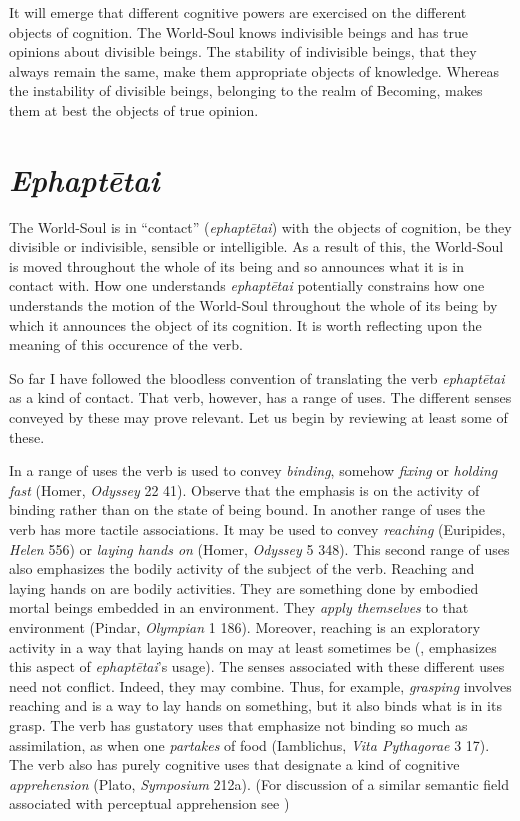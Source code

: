 It will emerge that different cognitive powers are exercised on the different objects of cognition. The World-Soul knows indivisible beings and has true opinions about divisible beings. The stability of indivisible beings, that they always remain the same, make them appropriate objects of knowledge. Whereas the instability of divisible beings, belonging to the realm of Becoming, makes them at best the objects of true opinion.


\section{\emph{Ephaptētai}} %
\label{sec:_emph_ephatetai}

The World-Soul is in ``contact'' (\emph{ephaptētai}) with the objects of cognition, be they divisible or indivisible, sensible or intelligible. As a result of this, the World-Soul is moved throughout the whole of its being and so announces what it is in contact with. How one understands \emph{ephaptētai} potentially constrains how one understands the motion of the World-Soul throughout the whole of its being by which it announces the object of its cognition. It is worth reflecting upon the meaning of this occurence of the verb. 

So far I have followed the bloodless convention of translating the verb \emph{ephaptētai} as a kind of contact. That verb, however, has a range of uses. The different senses conveyed by these may prove relevant. Let us begin by reviewing at least some of these.

In a range of uses the verb is used to convey \emph{binding}, somehow \emph{fixing} or \emph{holding fast} (Homer, \emph{Odyssey} 22 41). Observe that the emphasis is on the activity of binding rather than on the state of being bound. In another range of uses the verb has more tactile associations. It may be used to convey \emph{reaching} (Euripides, \emph{Helen} 556) or \emph{laying hands on} (Homer, \emph{Odyssey} 5 348). This second range of uses also emphasizes the bodily activity of the subject of the verb. Reaching and laying hands on are bodily activities. They are something done by embodied mortal beings embedded in an environment. They \emph{apply themselves} to that environment (Pindar, \emph{Olympian} 1 186). Moreover, reaching is an exploratory activity in a way that laying hands on may at least sometimes be (\citealt[134]{Betegh:2019fq}, emphasizes this aspect of \emph{ephaptētai}'s usage). The senses associated with these different uses need not conflict. Indeed, they may combine. Thus, for example, \emph{grasping} involves reaching and is a way to lay hands on something, but it also binds what is in its grasp. The verb has gustatory uses that emphasize not binding so much as assimilation, as when one \emph{partakes} of food (Iamblichus, \emph{Vita Pythagorae} 3 17). The verb also has purely cognitive uses that designate a kind of cognitive \emph{apprehension} (Plato, \emph{Symposium} 212a). (For discussion of a similar semantic field associated with perceptual apprehension see \citealt[chapters 1--2]{Kalderon:2018oe})

